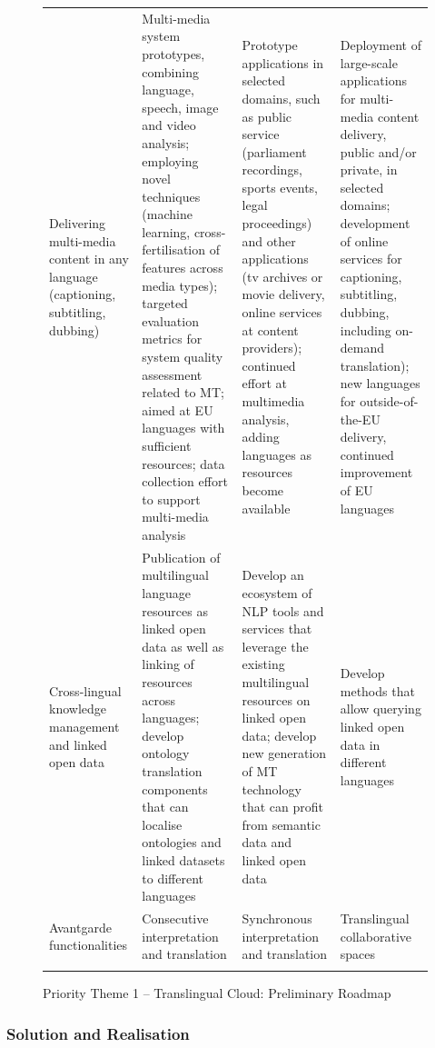 \documentclass[10pt, plain]{../../metanetpaper}
\begin{document}
\begin{multicols}{2}
\begin{figure}[htbp]
\begin{tabular}{@{}p{2.5cm}p{4cm}p{4cm}p{4cm}@{}}
    Delivering multi-media content in any language (captioning, subtitling, dubbing) & Multi-media system prototypes, combining language, speech, image and video analysis; employing novel techniques (machine learning, cross-fertilisation of features across media types); targeted evaluation metrics for system quality assessment related to MT; aimed at EU languages with sufficient resources; data collection effort to support multi-media analysis & Prototype applications in selected domains, such as public service (parliament recordings, sports events, legal proceedings) and other applications (tv archives or movie delivery, online services at content providers); continued effort at multimedia analysis, adding languages as resources become available & Deployment of large-scale applications for multi-media content delivery, public and/or private, in selected domains; development of online services for captioning, subtitling, dubbing, including on-demand translation); new languages for outside-of-the-EU delivery, continued improvement of EU languages \\ \addlinespace
Cross-lingual knowledge management and linked open data & Publication of multilingual language resources as linked open data as well as linking of resources across languages; develop ontology translation components that can localise ontologies and linked datasets to different languages & Develop an ecosystem of NLP tools and services that leverage the existing multilingual resources on linked open data; develop new generation of MT technology that can profit from semantic data and linked open data & Develop methods that allow querying linked open data in different languages \\ \addlinespace
Avantgarde functionalities & Consecutive interpretation and translation & Synchronous interpretation and translation & Translingual collaborative spaces \\ \addlinespace\bottomrule
  \end{tabular}
  \caption{Priority Theme 1 -- Translingual Cloud: Preliminary Roadmap}
  \label{fig:pt1-roadmap}
\end{figure}

\subsubsection{Solution and Realisation}
\label{sec:solut-techn-real-pt1}


\end{multicols}
\end{document}
